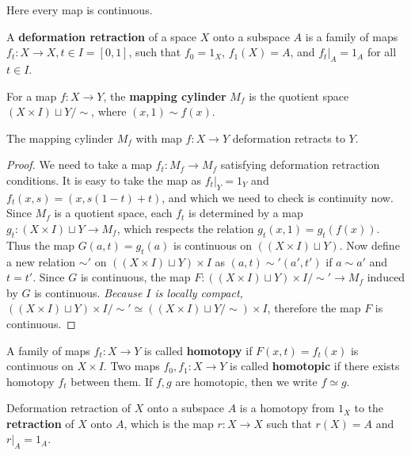 Here every map is continuous.
\begin{defn} A \textbf{deformation retraction} of a space $X$ onto a subspace $A$ is a family of maps $f_t:X\rightarrow X, t\in I=[0,1]$, such that $f_0=1_X$, $f_1(X)=A$, and $f_t|_A=1_A$ for all $t\in I$.
\end{defn}
\begin{defn} For a map $f:X\rightarrow Y$, the \textbf{mapping cylinder} $M_f$ is the quotient space $(X\times I)\sqcup Y/\sim$, where $(x,1)\sim f(x)$.
\end{defn}
\begin{prop} The mapping cylinder $M_f$ with map $f:X\rightarrow Y$ deformation retracts to $Y$.
\end{prop}
\begin{proof}
We need to take a map $f_t:M_f\rightarrow M_f$ satisfying deformation retraction conditions. It is easy to take the map as $f_t|_Y=1_Y$ and $f_t(x,s)=(x,s(1-t)+t)$, and which we need to check is continuity now. Since $M_f$ is a quotient space, each $f_t$ is determined by a map $g_t:(X\times I)\sqcup Y \rightarrow M_f$, which respects the relation $g_t(x,1)= g_t(f(x))$. Thus the map $G(a,t)=g_t(a)$ is continuous on $\left((X\times I)\sqcup Y\right)$. Now define a new relation $\sim'$ on $\left( (X\times I)\sqcup Y\right)\times I$ as $(a,t)\sim' (a',t')$ if $a\sim a'$ and $t=t'$. Since $G$ is continuous, the map $F:\left( (X\times I)\sqcup Y\right)\times I/\sim'\rightarrow M_f$ induced by $G$ is continuous. \textit{Because $I$ is locally compact,} $\left((X\times I)\sqcup Y\right)\times I/\sim' \simeq \left((X\times I)\sqcup Y/\sim\right)\times I$, therefore the map $F$ is continuous.
\end{proof}
\begin{defn} A family of maps $f_t:X\rightarrow Y$ is called \textbf{homotopy} if $F(x,t)=f_t(x)$ is continuous on $X\times I$. Two maps $f_0,f_1:X\rightarrow Y$ is called \textbf{homotopic} if there exists homotopy $f_t$ between them. If $f,g$ are homotopic, then we write $f\simeq g$.
\end{defn}
\begin{exmp} Deformation retraction of $X$ onto a subspace $A$ is a homotopy from $1_X$ to the \textbf{retraction} of $X$ onto $A$, which is the map $r:X\rightarrow X$ such that $r(X)=A$ and $r|_A=1_A$.
\end{exmp}
